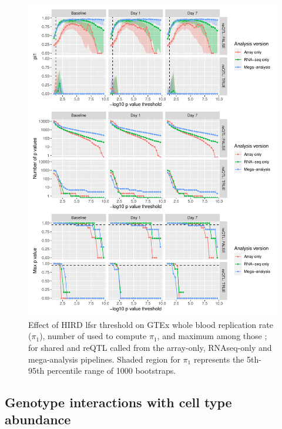 \begin{figure}
    \centering
    \includegraphics[width=1.0\textwidth,page=1]{mainmatter/figures/chapter_03/compute_pi1.pi1_by_thresholds.pdf}
    \caption{
        Effect of \gls{HIRD} lfsr threshold on GTEx whole blood replication rate ($\pi_1$), number of \pvalues{} used to compute $\pi_1$, and maximum \pvalue{} among those \pvalues{}; 
        for shared and \gls{reQTL} called from the array-only, \gls{RNAseq}-only and mega-analysis pipelines. 
        Shaded region for $\pi_1$ represents the 5th-95th percentile range of 1000 bootstraps.
    }
    \label{fig:hird_eQTL_pi1vsGTExWholeBlood}
\end{figure}

\subsection{Genotype interactions with cell type abundance}
\label{subsec:hird_reQTL_methods_cellTypeInteraction}


